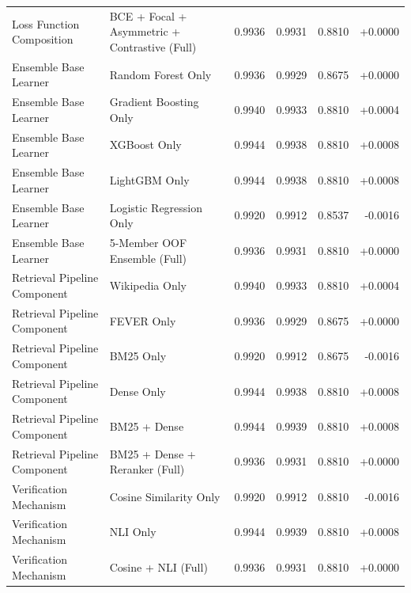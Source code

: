 \begin{table}[htbp]
\begin{center}
\begin{tabular}{llrrrr}
Loss Function Composition & BCE + Focal + Asymmetric + Contrastive (Full) & 0.9936 & 0.9931 & 0.8810 & +0.0000 \\
Ensemble Base Learner & Random Forest Only & 0.9936 & 0.9929 & 0.8675 & +0.0000 \\
Ensemble Base Learner & Gradient Boosting Only & 0.9940 & 0.9933 & 0.8810 & +0.0004 \\
Ensemble Base Learner & XGBoost Only & 0.9944 & 0.9938 & 0.8810 & +0.0008 \\
Ensemble Base Learner & LightGBM Only & 0.9944 & 0.9938 & 0.8810 & +0.0008 \\
Ensemble Base Learner & Logistic Regression Only & 0.9920 & 0.9912 & 0.8537 & -0.0016 \\
Ensemble Base Learner & 5-Member OOF Ensemble (Full) & 0.9936 & 0.9931 & 0.8810 & +0.0000 \\
Retrieval Pipeline Component & Wikipedia Only & 0.9940 & 0.9933 & 0.8810 & +0.0004 \\
Retrieval Pipeline Component & FEVER Only & 0.9936 & 0.9929 & 0.8675 & +0.0000 \\
Retrieval Pipeline Component & BM25 Only & 0.9920 & 0.9912 & 0.8675 & -0.0016 \\
Retrieval Pipeline Component & Dense Only & 0.9944 & 0.9938 & 0.8810 & +0.0008 \\
Retrieval Pipeline Component & BM25 + Dense & 0.9944 & 0.9939 & 0.8810 & +0.0008 \\
Retrieval Pipeline Component & BM25 + Dense + Reranker (Full) & 0.9936 & 0.9931 & 0.8810 & +0.0000 \\
Verification Mechanism & Cosine Similarity Only & 0.9920 & 0.9912 & 0.8810 & -0.0016 \\
Verification Mechanism & NLI Only & 0.9944 & 0.9939 & 0.8810 & +0.0008 \\
Verification Mechanism & Cosine + NLI (Full) & 0.9936 & 0.9931 & 0.8810 & +0.0000 \\
\bottomrule
\end{tabular}
\label{tab:ablations}
\end{center}
\end{table}